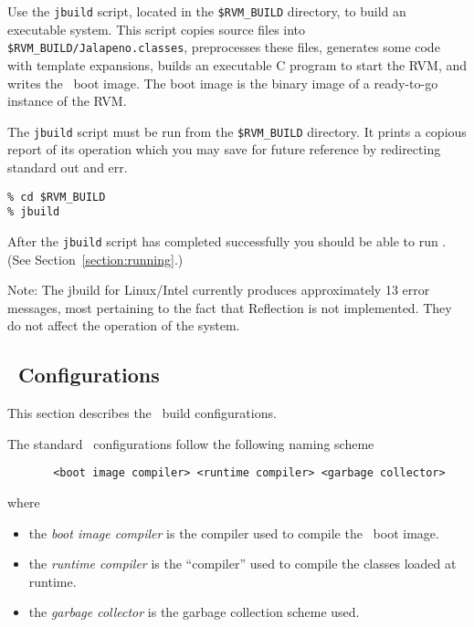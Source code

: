 \begin{enumerate}
Use the {\tt jbuild} script, located in the {\tt \$RVM\_BUILD} directory,
to build an executable system.  This script copies source files into
{\tt \$RVM\_BUILD/Jalapeno.classes}, preprocesses these files, generates
some code with template expansions, builds an executable C program to
start the RVM, and writes the \jp\ boot image.  The boot image is the
binary image of a ready-to-go instance of the RVM.

The {\tt jbuild} script must be run from the {\tt \$RVM\_BUILD}
directory. It prints a copious report of its operation which you may
save for future reference by redirecting standard out and err.

\begin{verbatim}
% cd $RVM_BUILD
% jbuild
\end{verbatim}


After the {\tt jbuild} script has completed successfully you should be able 
to run \jp.  (See Section~\ref{section:running}.)

Note: The jbuild for Linux/Intel currently produces approximately 13 error
messages, most pertaining to the fact that Reflection is not implemented.
They do not affect the operation of the system.

\end{enumerate}

\subsection{\jp\ Configurations}\label{configs}

This section describes the \jp\ build configurations.

The standard \jp\ configurations follow the following naming scheme
\begin{verbatim}
       <boot image compiler> <runtime compiler> <garbage collector>
\end{verbatim}

where
\begin{itemize}
\item the {\em boot image compiler} is the compiler used to compile the \jp\ boot image.
\item the {\em runtime compiler} is the ``compiler'' used to compile
the classes loaded at runtime.  
\item the {\em garbage collector} is the garbage collection scheme used.
\end{itemize}

